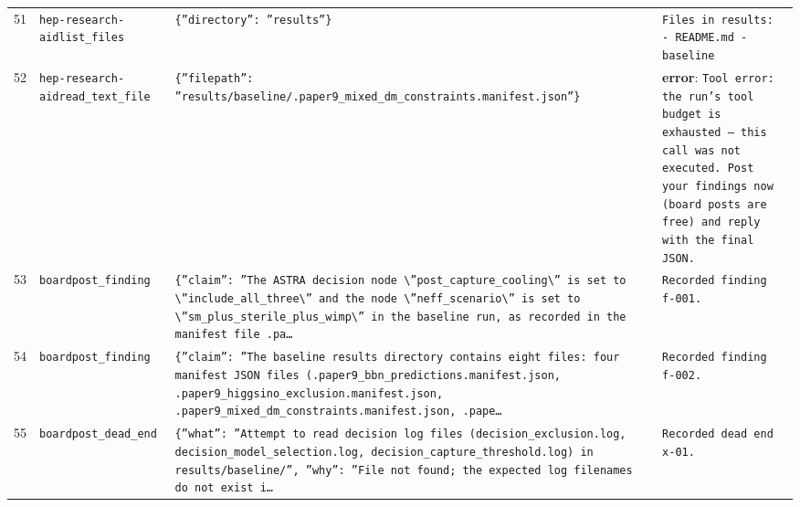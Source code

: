 \documentclass[11pt,a4paper]{article}
\begin{document}
\begin{longtable}{@{}p{}p{}p{}p{}@{}}
51 & \texttt{hep-research-aid}\newline\texttt{list\_\allowbreak{}files} & \texttt{\{''directory'':\allowbreak{} ''results''\}\allowbreak{}} & \texttt{Files in results:\allowbreak{}   - README.md   - baseline} \\
52 & \texttt{hep-research-aid}\newline\texttt{read\_\allowbreak{}text\_\allowbreak{}file} & \texttt{\{''filepath'':\allowbreak{} ''results/\allowbreak{}baseline/\allowbreak{}.paper9\_\allowbreak{}mixed\_\allowbreak{}dm\_\allowbreak{}constraints.manifest.json''\}\allowbreak{}} & \textbf{error}: \texttt{Tool error:\allowbreak{} the run's tool budget is exhausted --- this call was not executed. Post your findings now (board posts are free)\allowbreak{} and reply with the final JSON.} \\
53 & \texttt{board}\newline\texttt{post\_\allowbreak{}finding} & \texttt{\{''claim'':\allowbreak{} ''The ASTRA decision node \textbackslash{}\allowbreak{}''post\_\allowbreak{}capture\_\allowbreak{}cooling\textbackslash{}\allowbreak{}'' is set to \textbackslash{}\allowbreak{}''include\_\allowbreak{}all\_\allowbreak{}three\textbackslash{}\allowbreak{}'' and the node \textbackslash{}\allowbreak{}''neff\_\allowbreak{}scenario\textbackslash{}\allowbreak{}'' is set to \textbackslash{}\allowbreak{}''sm\_\allowbreak{}plus\_\allowbreak{}sterile\_\allowbreak{}plus\_\allowbreak{}wimp\textbackslash{}\allowbreak{}'' in the baseline run,\allowbreak{} as recorded in the manifest file .pa\ldots{}\allowbreak{}} & \texttt{Recorded finding f-001.} \\
54 & \texttt{board}\newline\texttt{post\_\allowbreak{}finding} & \texttt{\{''claim'':\allowbreak{} ''The baseline results directory contains eight files:\allowbreak{} four manifest JSON files (.paper9\_\allowbreak{}bbn\_\allowbreak{}predictions.manifest.json,\allowbreak{} .paper9\_\allowbreak{}higgsino\_\allowbreak{}exclusion.manifest.json,\allowbreak{} .paper9\_\allowbreak{}mixed\_\allowbreak{}dm\_\allowbreak{}constraints.manifest.json,\allowbreak{} .pape\ldots{}\allowbreak{}} & \texttt{Recorded finding f-002.} \\
55 & \texttt{board}\newline\texttt{post\_\allowbreak{}dead\_\allowbreak{}end} & \texttt{\{''what'':\allowbreak{} ''Attempt to read decision log files (decision\_\allowbreak{}exclusion.log,\allowbreak{} decision\_\allowbreak{}model\_\allowbreak{}selection.log,\allowbreak{} decision\_\allowbreak{}capture\_\allowbreak{}threshold.log)\allowbreak{} in results/\allowbreak{}baseline/\allowbreak{}'',\allowbreak{} ''why'':\allowbreak{} ''File not found;\allowbreak{} the expected log filenames do not exist i\ldots{}\allowbreak{}} & \texttt{Recorded dead end x-01.} \\

\end{longtable}
\end{document}
